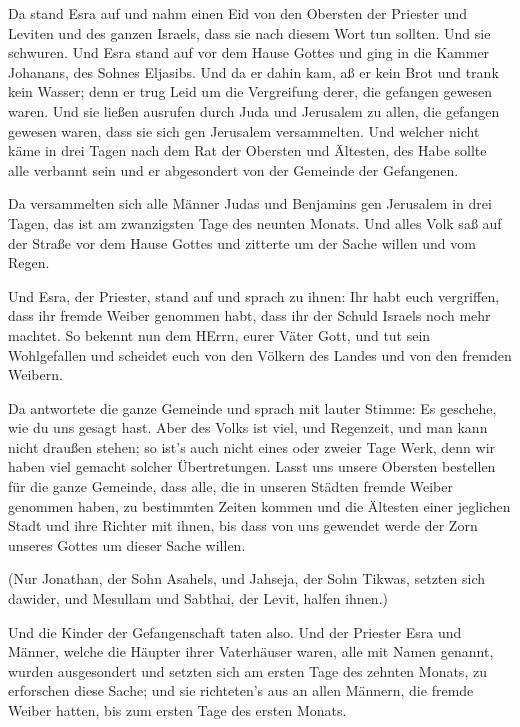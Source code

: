  Da stand Esra auf und nahm einen Eid von den Obersten der
Priester und Leviten und des ganzen Israels, dass sie nach diesem Wort
tun sollten. Und sie schwuren.  Und Esra stand auf vor dem
Hause Gottes und ging in die Kammer Johanans, des Sohnes Eljasibs. Und
da er dahin kam, aß er kein Brot und trank kein Wasser; denn er trug
Leid um die Vergreifung derer, die gefangen gewesen waren. 
Und sie ließen ausrufen durch Juda und Jerusalem zu allen, die gefangen
gewesen waren, dass sie sich gen Jerusalem versammelten. 
Und welcher nicht käme in drei Tagen nach dem Rat der Obersten und
Ältesten, des Habe sollte alle verbannt sein und er abgesondert von der
Gemeinde der Gefangenen.

 Da versammelten sich alle Männer Judas und Benjamins gen
Jerusalem in drei Tagen, das ist am zwanzigsten Tage des neunten Monats.
Und alles Volk saß auf der Straße vor dem Hause Gottes und zitterte um
der Sache willen und vom Regen.

 Und Esra, der Priester, stand auf und sprach zu ihnen: Ihr
habt euch vergriffen, dass ihr fremde Weiber genommen habt, dass ihr der
Schuld Israels noch mehr machtet.  So bekennt nun dem
HErrn, eurer Väter Gott, und tut sein Wohlgefallen und scheidet euch von
den Völkern des Landes und von den fremden Weibern.

 Da antwortete die ganze Gemeinde und sprach mit lauter
Stimme: Es geschehe, wie du uns gesagt hast.  Aber des
Volks ist viel, und Regenzeit, und man kann nicht draußen stehen; so
ist's auch nicht eines oder zweier Tage Werk, denn wir haben viel
gemacht solcher Übertretungen.  Lasst uns unsere Obersten
bestellen für die ganze Gemeinde, dass alle, die in unseren Städten
fremde Weiber genommen haben, zu bestimmten Zeiten kommen und die
Ältesten einer jeglichen Stadt und ihre Richter mit ihnen, bis dass von
uns gewendet werde der Zorn unseres Gottes um dieser Sache willen.

 (Nur Jonathan, der Sohn Asahels, und Jahseja, der Sohn
Tikwas, setzten sich dawider, und Mesullam und Sabthai, der Levit,
halfen ihnen.)

 Und die Kinder der Gefangenschaft taten also. Und der
Priester Esra und Männer, welche die Häupter ihrer Vaterhäuser waren,
alle mit Namen genannt, wurden ausgesondert und setzten sich am ersten
Tage des zehnten Monats, zu erforschen diese Sache;  und
sie richteten's aus an allen Männern, die fremde Weiber hatten, bis zum
ersten Tage des ersten Monats.

